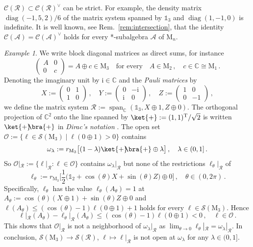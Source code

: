 \documentclass[a4paper,11pt,reqno]{amsart}
\newcommand{\C}{\mathbb{C}}
\newcommand{\M}{\mathrm{M}}
\newcommand{\cA}{\mathcal{A}}
\newcommand{\cC}{\mathcal{C}}
\newcommand{\cO}{\mathcal{O}}
\newcommand{\cR}{\mathcal{R}}
\newcommand{\cS}{\mathcal{S}}
\newcommand{\ii}{\mathrm{i}}
\newcommand{\id}{\mathds{1}}
\newcommand{\tp}{{}^\mathrm{T}}
\DeclareMathOperator\diag{diag}
\DeclareMathOperator\spn{span}
\theoremstyle{definition}
\theoremstyle{remark}
\newtheorem{exa}[thm]{Example}
\numberwithin{equation}{section}
\begin{document}
$\cC(\cR)\subset\cC(\cR)^\vee$ can be strict. For example, the density matrix 
$\diag(-1,5,2)/6$ of the matrix system spanned by $\id_3$ and $\diag(1,-1,0)$ is 
indefinite. It is well known, see Rem.~\ref{rem:intersection}, that the identity 
$\cC(\cA)=\cC(\cA)^\vee$ holds for every *-subalgebra $\cA$ of $\M_n$.
\par
%
\begin{exa}\label{ex:ex1}
We write block diagonal matrices as direct sums, for instance
\[\textstyle
\begin{pmatrix}
A & 0\\
0 & c
\end{pmatrix}
=A\oplus c\in\M_3
\quad
\text{for every}
\quad
A\in\M_2\,,
\quad
c\in\C\cong\M_1\,.
\]
Denoting the imaginary unit by $\ii\in\C$ and the \emph{Pauli matrices} by
\[\textstyle
X:=\begin{pmatrix}
0&1\\1&0
\end{pmatrix}\,,
\quad
Y:=\begin{pmatrix}
0&-\ii\\\ii&0
\end{pmatrix}\,,
\quad 
Z:=\begin{pmatrix}
1&0\\0&-1
\end{pmatrix}\,,
\]
we define the matrix system $\cR:=\spn_\C(\id_3,X\oplus 1,Z\oplus 0)$.
The orthogonal projection of $\C^2$ onto the line spanned by 
$\ket{+}:=(1,1)\tp/\sqrt{2}$ is written $\ket{+}\!\!\bra{+}$ in 
\emph{Dirac's notation} \cite{BengtssonZyczkowski2017,Buckley2021}. 
The open set $\cO:=\{\ell\in\cS(\M_3)\mid\ell(0\oplus 1)>0\}$
contains 
\[\textstyle
\omega_\lambda
:=r_{\M_3}\big[(1-\lambda)\ket{+}\!\!\bra{+}\oplus\lambda\big]\,,
\quad
\lambda\in(0,1]\,.
\]
So $\cO|_\cR:=\{\ell|_\cR:\ell\in\cO\}$ contains $\omega_\lambda|_\cR$
but none of the restrictions $\ell_\theta|_\cR$ of
\[\textstyle
\ell_\theta:=
r_{\M_3}\big[\frac{1}{2}\big(\id_2+\cos(\theta)X+\sin(\theta)Z\big)\oplus 0\big]\,,
\quad
\theta\in(0,2\pi)\,.
\]
Specifically, $\ell_\theta$ has the value $\ell_\theta(A_\theta)=1$ at 
$A_\theta:=\cos(\theta)(X\oplus 1)+\sin(\theta)Z\oplus 0$ and
$\ell(A_\theta)\leq (\cos(\theta)-1)\ell(0\oplus 1)+1$ holds for every 
$\ell\in\cS(\M_3)$. Hence
\[\textstyle
\ell|_\cR(A_\theta)-\ell_\theta|_\cR(A_\theta)
\leq(\cos(\theta)-1)\ell(0\oplus 1)<0\,,
\quad
\ell\in\cO\,.
\]
This shows that $\cO|_\cR$ is not a neighborhood of $\omega_\lambda|_\cR$
as $\lim_{\theta\to0}\ell_\theta|_\cR=\omega_\lambda|_\cR$. In conclusion, 
$\cS(\M_3)\to\cS(\cR)$, $\ell\mapsto\ell|_{\cR}$ is not open at 
$\omega_\lambda$ for any $\lambda\in(0,1]$.
\end{exa}
\end{document}

